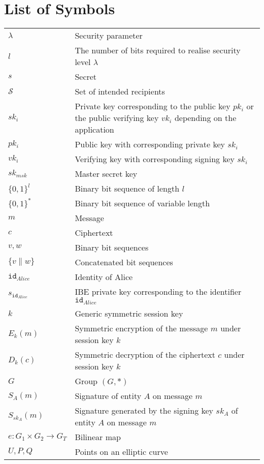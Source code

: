 \documentclass[master=eelt,masteroption=em]{kulemt}
\theoremstyle{plain}
\theoremstyle{definition}
\newcommand{\id}[1]{\ensuremath{\mathtt{id}_{#1}}}
\begin{document}
\chapter{List of Symbols}
\begin{flushleft}
 \renewcommand{\arraystretch}{1.1}
 \begin{tabularx}{\textwidth}{@{}p{30mm}X@{}}
  $\lambda$ & Security parameter \\
  $l$ & The number of bits required to realise security level $\lambda$ \\
  $s$ & Secret \\
  $\mathcal{S}$ & Set of intended recipients \\
  $sk_i$ & Private key corresponding to the public key $pk_i$ or the public verifying key $vk_i$ depending on the application \\
  $pk_i$ & Public key with corresponding private key $sk_i$ \\
  $vk_i$ & Verifying key with corresponding signing key $sk_i$ \\
  $sk_{msk}$ & Master secret key \\
  $\{ 0,1 \}^l$ & Binary bit sequence of length $l$ \\
  $\{ 0,1 \}^*$ & Binary bit sequence of variable length \\
  $m$ & Message \\
  $c$ & Ciphertext \\
  $v, w$ & Binary bit sequences \\
  $\{ v \parallel w \}$ & Concatenated bit sequences \\
  \id{Alice} & Identity of Alice \\ 
  $s_{\id{Alice}}$ & IBE private key corresponding to the identifier \id{Alice} \\
  $k$ & Generic symmetric session key \\
  $E_k \left( m \right)$ & Symmetric encryption of the message $m$ under session key $k$ \\
  $D_k \left( c \right)$ & Symmetric decryption of the ciphertext $c$ under session key $k$ \\
  $G$ & Group $\left( G, * \right)$ \\
  $S_A \left( m \right)$ & Signature of entity $A$ on message $m$ \\
  $S_{sk_A} \left( m \right)$ & Signature generated by the signing key $sk_A$ of entity $A$ on message $m$ \\
  $e: G_1 \times G_2 \rightarrow G_T$ & Bilinear map \\
  $U, P, Q$ & Points on an elliptic curve \\ 
    \end{tabularx}
\end{flushleft}
\end{document}
